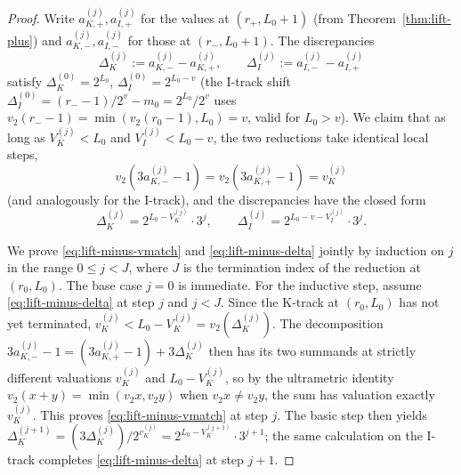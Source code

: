 \documentclass[11pt,reqno]{amsart}
\theoremstyle{plain}
\theoremstyle{definition}
\theoremstyle{remark}
\newcommand{\Vk}{V_{K}}
\newcommand{\Vi}{V_{I}}
\newcommand{\vk}{v_{K}}
\newcommand{\vtwo}{v_{2}}
\begin{document}
\begin{proof}
Write $a_{K,+}^{(j)}, a_{I,+}^{(j)}$ for the values at $(r_+, L_0+1)$
(from Theorem~\ref{thm:lift-plus}) and $a_{K,-}^{(j)}, a_{I,-}^{(j)}$ for
those at $(r_-, L_0+1)$. The discrepancies
\[
\Delta_K^{(j)} := a_{K,-}^{(j)} - a_{K,+}^{(j)}, \qquad \Delta_I^{(j)} := a_{I,-}^{(j)} - a_{I,+}^{(j)}
\]
satisfy $\Delta_K^{(0)} = 2^{L_0}$, $\Delta_I^{(0)} = 2^{L_0 - v}$ (the
I-track shift $\Delta_I^{(0)} = (r_- - 1)/2^v - m_0 = 2^{L_0}/2^v$ uses
$\vtwo(r_- - 1) = \min(\vtwo(r_0 - 1), L_0) = v$, valid for $L_0 > v$).
We claim that as long as $\Vk^{(j)} < L_0$ and $\Vi^{(j)} < L_0 - v$, the two
reductions take identical local steps,
\begin{equation}\label{eq:lift-minus-vmatch}
v_2\!\left(3 a_{K,-}^{(j)} - 1\right) = v_2\!\left(3 a_{K,+}^{(j)} - 1\right) = \vk^{(j)}
\end{equation}
(and analogously for the I-track), and the discrepancies have the closed
form
\begin{equation}\label{eq:lift-minus-delta}
\Delta_K^{(j)} = 2^{L_0 - \Vk^{(j)}} \cdot 3^j, \qquad \Delta_I^{(j)} = 2^{L_0 - v - \Vi^{(j)}} \cdot 3^j.
\end{equation}

We prove \eqref{eq:lift-minus-vmatch} and \eqref{eq:lift-minus-delta} jointly
by induction on $j$ in the range $0 \le j < J$, where $J$ is the termination
index of the reduction at $(r_0, L_0)$. The base case $j = 0$ is immediate.
For the inductive step, assume \eqref{eq:lift-minus-delta} at step $j$ and
$j < J$. Since the K-track at $(r_0, L_0)$ has not yet terminated,
$\vk^{(j)} < L_0 - \Vk^{(j)} = \vtwo(\Delta_K^{(j)})$. The decomposition
$3 a_{K,-}^{(j)} - 1 = (3 a_{K,+}^{(j)} - 1) + 3 \Delta_K^{(j)}$ then has its
two summands at strictly different valuations $\vk^{(j)}$ and
$L_0 - \Vk^{(j)}$, so by the ultrametric identity
$\vtwo(x + y) = \min(\vtwo x, \vtwo y)$ when $\vtwo x \ne \vtwo y$, the sum
has valuation exactly $\vk^{(j)}$. This proves \eqref{eq:lift-minus-vmatch}
at step $j$. The basic step then yields
$\Delta_K^{(j+1)} = (3 \Delta_K^{(j)})/2^{\vk^{(j)}} = 2^{L_0 - \Vk^{(j+1)}} \cdot 3^{j+1}$;
the same calculation on the I-track completes
\eqref{eq:lift-minus-delta} at step $j+1$.


\end{proof}
\end{document}
